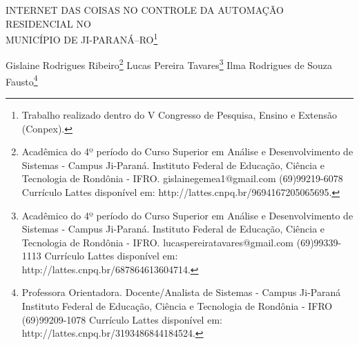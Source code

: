 \documentclass[article,12pt,onesidea,4paper,english,brazil]{abntex2}
\begin{document}
	
	
	\frenchspacing 
	
	\begin{center}
		\LARGE INTERNET DAS COISAS NO CONTROLE DA AUTOMAÇÃO RESIDENCIAL NO \\MUNICÍPIO DE JI-PARANÁ–RO\footnote{Trabalho realizado dentro do V Congresso de Pesquisa, Ensino e Extensão (Conpex).}
		
		\normalsize
	Gislaine Rodrigues Ribeiro\footnote{Acadêmica do 4º período do Curso Superior em Análise e Desenvolvimento de Sistemas -
		Campus Ji-Paraná. Instituto Federal de Educação, Ciência e Tecnologia de Rondônia - IFRO.
		gislainegemea1@gmail.com (69)99219-6078 Currículo Lattes disponível em:
		http://lattes.cnpq.br/9694167205065695.} 
	Lucas Pereira Tavares\footnote{Acadêmico do 4º período do Curso Superior em Análise e Desenvolvimento de Sistemas -
		Campus Ji-Paraná. Instituto Federal de Educação, Ciência e Tecnologia de Rondônia - IFRO.
		lucaspereiratavares@gmail.com (69)99339-1113 Currículo Lattes disponível em:
		http://lattes.cnpq.br/687864613604714.} 
	Ilma Rodrigues de Souza Fausto\footnote{Professora Orientadora. Docente/Analista de Sistemas - Campus Ji-Paraná
		Instituto Federal de Educação, Ciência e Tecnologia de Rondônia - IFRO
		(69)99209-1078 Currículo Lattes disponível em: http://lattes.cnpq.br/3193486844184524.} 
	\end{center}
	
\end{document}
